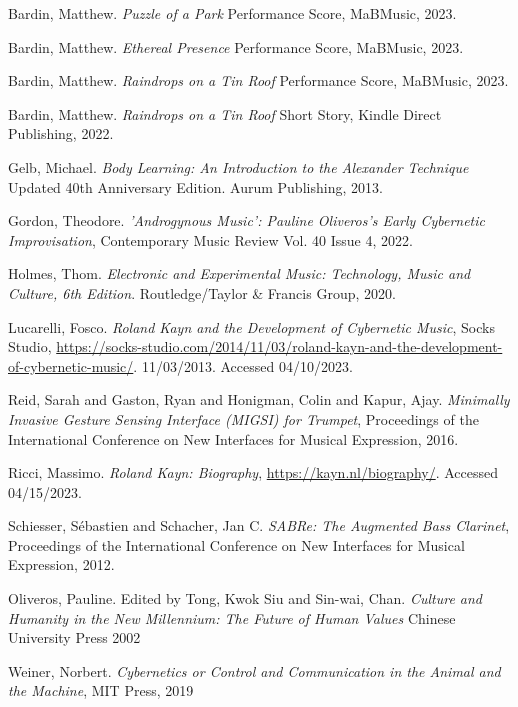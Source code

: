 \begin{thebibliography}{99}

 Bardin, Matthew. \emph{Puzzle of a Park} Performance Score, MaBMusic, 2023.

 Bardin, Matthew. \emph{Ethereal Presence} Performance Score, MaBMusic, 2023.

 Bardin, Matthew. \emph{Raindrops on a Tin Roof} Performance Score, MaBMusic, 2023.

 Bardin, Matthew. \emph{Raindrops on a Tin Roof} Short Story, Kindle Direct Publishing, 2022.

 Gelb, Michael. \emph{Body Learning: An Introduction to the Alexander Technique} Updated 40th Anniversary Edition. Aurum Publishing, 2013.

 Gordon, Theodore. \emph{'Androgynous Music': Pauline Oliveros's Early Cybernetic Improvisation}, Contemporary Music Review Vol. 40 Issue 4, 2022.

 Holmes, Thom. \emph{Electronic and Experimental Music: Technology, Music and Culture, 6th Edition}. Routledge/Taylor \& Francis Group, 2020. 

 Lucarelli, Fosco. \emph{Roland Kayn and the Development of Cybernetic Music}, Socks Studio, \url{https://socks-studio.com/2014/11/03/roland-kayn-and-the-development-of-cybernetic-music/}. 11/03/2013. Accessed 04/10/2023.

 Reid, Sarah and Gaston, Ryan and Honigman, Colin and Kapur, Ajay. \emph{Minimally Invasive Gesture Sensing Interface (MIGSI) for Trumpet}, Proceedings of the International Conference on New Interfaces for Musical Expression, 2016.

 Ricci, Massimo. \emph{Roland Kayn: Biography}, \url{https://kayn.nl/biography/}. Accessed 04/15/2023.

 Schiesser, S{\'e}bastien and Schacher, Jan C. \emph{SABRe: The Augmented Bass Clarinet}, Proceedings of the International Conference on New Interfaces for Musical Expression, 2012.

 Oliveros, Pauline. Edited by Tong, Kwok Siu and Sin-wai, Chan. \emph{Culture and Humanity in the New Millennium: The Future of Human Values} Chinese University Press 2002

 Weiner, Norbert. \emph{Cybernetics or Control and Communication in the Animal and the Machine}, MIT Press, 2019




\end{thebibliography}


